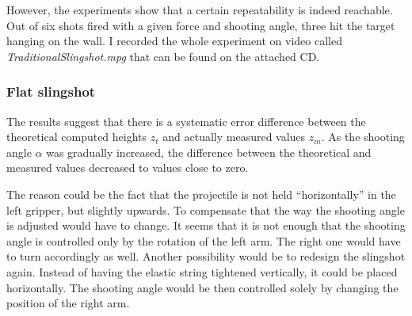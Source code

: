 			However, the experiments show that a certain repeatability is indeed reachable. Out of six shots fired with a given force and shooting angle, three hit the target hanging on the wall. I recorded the whole experiment on video called \textit{TraditionalSlingshot.mpg} that can be found on the attached CD.

		\subsubsection{Flat slingshot}
			The results suggest that there is a systematic error difference between the theoretical computed heights $z_t$ and actually measured values $z_m$. As the shooting angle $\alpha$ was gradually increased, the difference between the theoretical and measured values decreased to values close to zero.

			The reason could be the fact that the projectile is not held ``horizontally'' in the left gripper, but slightly upwards. To compensate that the way the shooting angle is adjusted would have to change. It seems that it is not enough that the shooting angle is controlled only by the rotation of the left arm. The right one would have to turn accordingly as well. Another possibility would be to redesign the slingshot again. Instead of having the elastic string tightened vertically, it could be placed horizontally. The shooting angle would be then controlled solely by changing the position of the right arm.
		
		
	
			
			
			